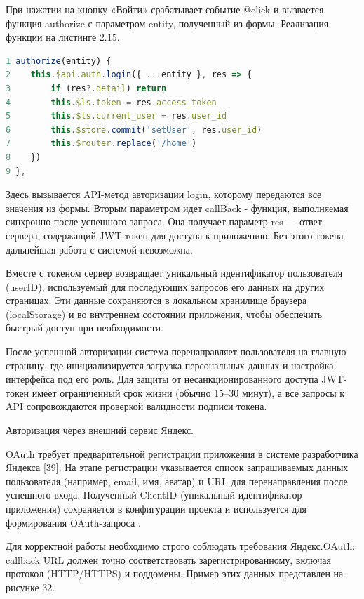 \documentclass[a4paper,14pt,oneside]{extreport}
\begin{document}
При нажатии на кнопку «Войти» срабатывает событие @click и вызвается функция authorize с параметром entity, полученный из формы. Реализация функции на листинге 2.15.

\begin{lstlisting}[language=JavaScript, caption=Метод авторизации пользователя,breaklines=true, ]
1 authorize(entity) {
2    this.$api.auth.login({ ...entity }, res => {
3        if (res?.detail) return
4        this.$ls.token = res.access_token
5        this.$ls.current_user = res.user_id
6        this.$store.commit('setUser', res.user_id)
7        this.$router.replace('/home')
8    })
9 },
\end{lstlisting}


Здесь вызывается API-метод авторизации login, которому передаются все значения из формы. Вторым параметром идет callBack - функция, выполняемая синхронно после успешного запроса. Она получает параметр res — ответ сервера, содержащий JWT-токен для доступа к приложению. Без этого токена дальнейшая работа с системой невозможна.

Вместе с токеном сервер возвращает уникальный идентификатор пользователя (userID), используемый для последующих запросов его данных на других страницах. Эти данные сохраняются в локальном хранилище браузера (localStorage) и во внутреннем состоянии приложения, чтобы обеспечить быстрый доступ при необходимости.

После успешной авторизации система перенаправляет пользователя на главную страницу, где инициализируется загрузка персональных данных и настройка интерфейса под его роль. Для защиты от несанкционированного доступа JWT-токен имеет ограниченный срок жизни (обычно 15–30 минут), а все запросы к API сопровождаются проверкой валидности подписи токена.

Авторизация через внешний сервис Яндекс.

OAuth требует предварительной регистрации приложения в системе разработчика Яндекса [39]. На этапе регистрации указывается список запрашиваемых данных пользователя (например, email, имя, аватар) и URL для перенаправления после успешного входа. Полученный ClientID (уникальный идентификатор приложения) сохраняется в конфигурации проекта и используется для формирования OAuth-запроса .

Для корректной работы необходимо строго соблюдать требования Яндекс.OAuth: callback URL должен точно соответствовать зарегистрированному, включая протокол (HTTP/HTTPS) и поддомены. Пример этих данных представлен на рисунке 32. 
\end{document}

